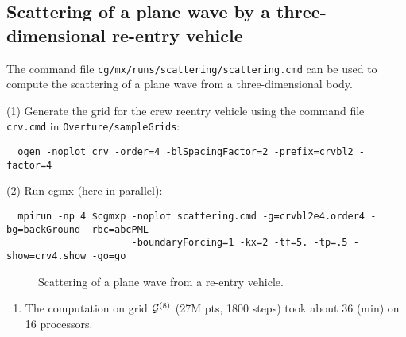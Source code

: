 \subsection{Scattering of a plane wave by a three-dimensional re-entry vehicle} \label{sec:scatCRV}

The command file {\tt cg/mx/runs/scattering/scattering.cmd} can be used to compute the scattering
of a plane wave from a three-dimensional body.

\noindent (1) Generate the grid for the crew reentry vehicle using the command file {\tt crv.cmd} in {\tt Overture/sampleGrids}:
{\small
\begin{verbatim}
  ogen -noplot crv -order=4 -blSpacingFactor=2 -prefix=crvbl2 -factor=4
\end{verbatim}
}
\noindent (2) Run cgmx (here in parallel): 
\begin{verbatim}
  mpirun -np 4 $cgmxp -noplot scattering.cmd -g=crvbl2e4.order4 -bg=backGround -rbc=abcPML 
                      -boundaryForcing=1 -kx=2 -tf=5. -tp=.5 -show=crv4.show -go=go 
\end{verbatim}

{
\begin{figure}[hbt]
\newcommand{\figWidth}{7.5cm}
\newcommand{\trimfig}[2]{\trimFig{#1}{#2}{0.1}{0.05}{.05}{.05}}
\begin{center}
\end{center}
\caption{Scattering of a plane wave from a re-entry vehicle.}
\label{fig:scatCRV}
\end{figure}
\begin{enumerate}
  \item The computation on grid ${\mathcal G}^{(8)}$ (27M pts, 1800 steps) took about $36$ (min) on 16 processors. 
\end{enumerate}

}

